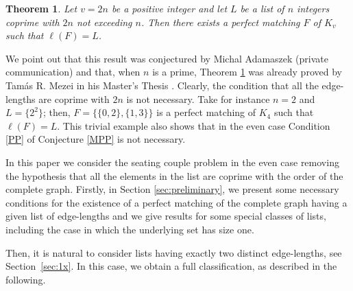 \documentclass{amsart}
\newtheorem{thm}[defi]{Theorem}
\theoremstyle{definition}
\numberwithin{equation}{section}
\begin{document}
\begin{thm}\label{thm:KSC}
Let $v=2n$ be a positive integer and let $L$ be a list of $n$ integers coprime with $2n$ not exceeding $n$.
Then there exists a perfect matching $F$ of $K_v$ such that $\ell(F)=L$.
\end{thm}

We point out that this result was conjectured by Michal
Adamaszek  (private communication) and that, when $n$ is a prime, Theorem \ref{thm:KSC} was already proved by
Tam\'as R. Mezei in his Master's Thesis \cite{M}.
Clearly, the condition that all the edge-lengths are coprime with $2n$ is not necessary.
Take for instance $n=2$ and $L=\{2^2\}$; then, $F=\{\{0,2\},\{1,3\}\}$ is a perfect matching of $K_4$ such that $\ell(F)=L$.
This trivial example also shows that in the even case Condition  \eqref{PP} of Conjecture \ref{MPP} is not necessary.

In this paper we consider the seating couple problem in the even case removing the hypothesis that all the elements in the list are coprime
with the order of the complete graph.
Firstly, in Section \ref{sec:preliminary}, we present some necessary conditions for the existence of a perfect matching
of the complete graph having a given list of edge-lengths and we give results for some special classes of lists, including the case in which the underlying set has size one.

Then, it is natural to consider lists having exactly two distinct edge-lengths, see Section~\ref{sec:1x}. In this case, we obtain a full classification,
as described in the following.
\end{document}
